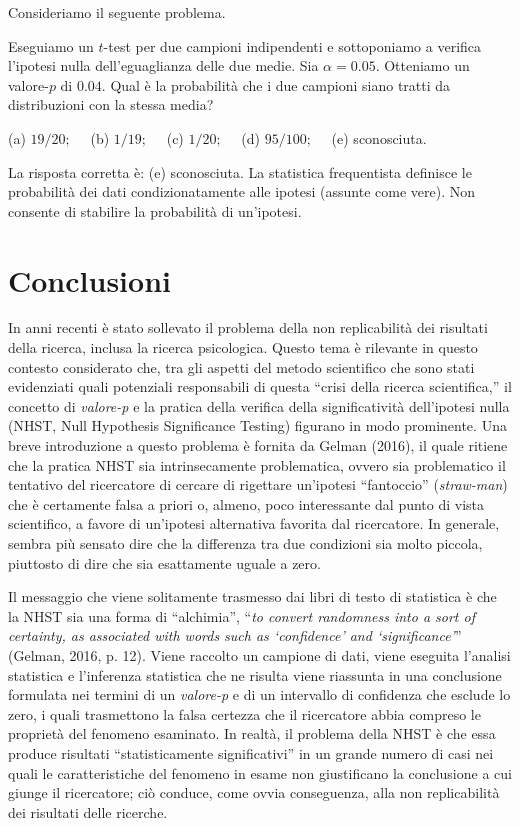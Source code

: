 Consideriamo il seguente problema. 
\begin{exmp}
Eseguiamo un $t$-test per due campioni indipendenti e sottoponiamo a verifica l'ipotesi nulla dell'eguaglianza delle due medie. Sia $\alpha = 0.05$.  Otteniamo un valore-$p$ di $0.04$. Qual è la probabilità che i due campioni siano tratti da distribuzioni con la stessa media?

\medskip
\noindent
(a) $19/20; \quad$ (b) $1/19; \quad$ (c) $1/20; \quad$ (d) $95/100; \quad$ (e) sconosciuta.
\end{exmp}
\begin{solu}
La risposta corretta è: (e) sconosciuta. La statistica frequentista definisce le probabilità dei dati condizionatamente alle ipotesi (assunte come vere). Non consente di stabilire la probabilità di un'ipotesi.
\end{solu}

\section*{Conclusioni}

In anni recenti è stato sollevato il problema della non replicabilità dei risultati della ricerca, inclusa la ricerca psicologica. 
Questo tema è rilevante in questo contesto considerato che, tra gli aspetti del metodo scientifico che sono stati evidenziati quali potenziali responsabili di questa ``crisi della ricerca scientifica,'' il concetto di \emph{valore-p} e la pratica della verifica della significatività dell’ipotesi nulla (NHST, Null Hypothesis Significance Testing) figurano in modo prominente. 
Una breve introduzione a questo problema è fornita da Gelman (2016), il quale ritiene che la pratica NHST sia intrinsecamente problematica, ovvero sia problematico  il tentativo del ricercatore di cercare di rigettare un'ipotesi ``fantoccio'' (\emph{straw-man}) che è certamente falsa a priori o, almeno, poco interessante dal punto di vista scientifico, a favore di un'ipotesi alternativa favorita dal ricercatore. 
In generale, sembra più sensato dire che la differenza tra due condizioni sia molto piccola, piuttosto di dire che sia esattamente uguale a zero. 

Il messaggio che viene solitamente trasmesso dai libri di testo di statistica è che la NHST sia una forma di ``alchimia'', ``\emph{to convert randomness into a sort of certainty, as associated with words such as `confidence' and `significance'}'' (Gelman, 2016, p. 12). 
Viene raccolto un campione di dati, viene eseguita l'analisi statistica e l'inferenza statistica che ne risulta viene riassunta in una conclusione formulata nei termini di un \emph{valore-p} e di un intervallo di confidenza che esclude lo zero, i quali trasmettono la falsa certezza che il ricercatore abbia compreso le proprietà del fenomeno esaminato. 
In realtà, il problema della NHST è che essa produce risultati ``statisticamente significativi'' in un grande numero di casi nei quali le caratteristiche del fenomeno in esame non giustificano la conclusione a cui giunge il ricercatore; ciò conduce, come ovvia conseguenza, alla non replicabilità dei risultati delle ricerche. 

